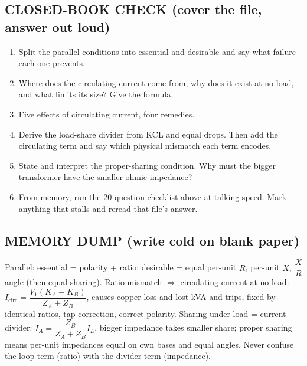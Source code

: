 \documentclass[11pt]{article}
\begin{document}
\subsection*{\color{copper}CLOSED-BOOK CHECK (cover the file, answer out loud)}
\begin{enumerate}[label=\arabic*.]
\item Split the parallel conditions into essential and desirable and say what failure each one prevents.
\item Where does the circulating current come from, why does it exist at no load, and what limits its size? Give the formula.
\item Five effects of circulating current, four remedies.
\item Derive the load-share divider from KCL and equal drops. Then add the circulating term and say which physical mismatch each term encodes.
\item State and interpret the proper-sharing condition. Why must the bigger transformer have the smaller ohmic impedance?
\item From memory, run the 20-question checklist above at talking speed. Mark anything that stalls and reread that file's answer.
\end{enumerate}

\subsection*{\color{copper}MEMORY DUMP (write cold on blank paper)}
Parallel: essential = polarity + ratio; desirable = equal per-unit $R$, per-unit $X$, $\dfrac{X}{R}$ angle (then equal sharing). Ratio mismatch $\Rightarrow$ circulating current at no load: $I_{\text{circ}} = \dfrac{V_1(K_A - K_B)}{Z_A + Z_B}$, causes copper loss and lost kVA and trips, fixed by identical ratios, tap correction, correct polarity. Sharing under load = current divider: $I_A = \dfrac{Z_B}{Z_A + Z_B} I_L$, bigger impedance takes smaller share; proper sharing means per-unit impedances equal on own bases and equal angles. Never confuse the loop term (ratio) with the divider term (impedance).
\end{document}
